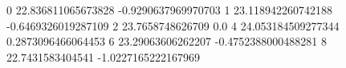 0 22.836811065673828 -0.9290637969970703
1 23.118942260742188 -0.6469326019287109
2 23.7658748626709 0.0
4 24.053184509277344 0.2873096466064453
6 23.29063606262207 -0.4752388000488281
8 22.7431583404541 -1.0227165222167969
